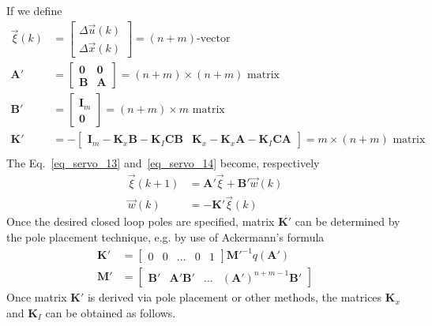 \documentclass[11pt,a4paper,oneside]{book}
\numberwithin{equation}{section}
\theoremstyle{it}
\theoremstyle{definition}
\begin{document}
If we define 
\begin{equation*}
	\begin{aligned}
		\vec{\xi}(k) &= 
		\begin{bmatrix}
			\Delta\vec{u}(k) \\[6pt]  
			\Delta\vec{x}(k)
		\end{bmatrix} = \text{$(n+m)$-vector} \\[6pt]
		\mathbf{A'} &= 
		\begin{bmatrix}
			\mathbf{0} & \mathbf{0} \\[6pt]  
			\mathbf{B} & \mathbf{A}
		\end{bmatrix} = \text{$(n+m)\times(n+m)$ matrix} \\[6pt]
		\mathbf{B'} &= 
		\begin{bmatrix}
			\mathbf{I}_m \\[6pt]  
			\mathbf{0}
		\end{bmatrix}= \text{$(n+m)\times m$ matrix} \\[6pt] 
		\mathbf{K'} &= -
		\begin{bmatrix}
			\mathbf{I}_m-\mathbf{K}_x\mathbf{B}-\mathbf{K}_I\mathbf{C}\mathbf{B}
			&  
			\mathbf{K}_x-\mathbf{K}_x\mathbf{A}-\mathbf{K}_I\mathbf{C}\mathbf{A}
		\end{bmatrix}= \text{$m \times (n+m)$ matrix} \\[6pt] 
	\end{aligned}
\end{equation*}
The Eq.~\eqref{eq_servo_13} and~\eqref{eq_servo_14} become, respectively
\begin{equation}\label{eq_servo_15}
	\begin{aligned}
		\vec{\xi}(k+1) &= \mathbf{A'}\vec{\xi}+\mathbf{B'}\vec{w}(k) \\[6pt] 
		\vec{w}(k) &= -\mathbf{K'}\vec{\xi}(k)
	\end{aligned}
\end{equation}
Once the desired closed loop poles are specified, matrix $\mathbf{K'}$ can be 
determined by the pole placement technique, e.g. by use of Ackermann's formula
\begin{equation*}
	\begin{aligned}
		\mathbf{K'} &= \begin{bmatrix} 0&0&...&0&1 \end{bmatrix} 
		\mathbf{M'}^{-1}q(\mathbf{A'}) \\[6pt]
		\mathbf{M'} &= \begin{bmatrix} 
			\mathbf{B'}&\mathbf{A'}\mathbf{B'}&...&\left( \mathbf{A'}\right) 
			^{n+m-1}\mathbf{B'} \end{bmatrix}
	\end{aligned}
\end{equation*}
Once matrix $\mathbf{K'}$ is derived via pole placement or other methods, the matrices $\mathbf{K}_x$ and 
$\mathbf{K}_I$ can be obtained as follows.
\end{document}
